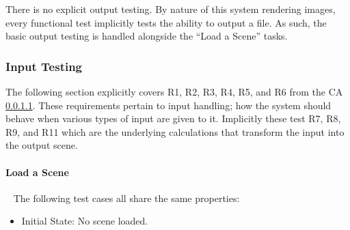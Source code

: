 \documentclass[12pt, titlepage]{article}
\begin{document}
There is no explicit output testing. By nature of this system rendering images, 
every functional test implicitly tests the ability to output a file. As such, 
the basic output testing is handled alongside the ``Load a Scene'' tasks.

%

\subsubsection{Input Testing}
The following section explicitly covers R1, R2, R3, R4, R5, and R6  from the CA 
\ref{}.   These requirements pertain to input handling; how the system should 
behave when various types of input are given to it. Implicitly these test R7, 
R8, R9, and R11 which are the underlying calculations that transform the input 
into the output scene.

		
\paragraph{Load a Scene}
~\newline
The following test cases all share the same properties:

\begin{itemize}
	\item[] Initial State: No scene loaded.
\end{itemize}
\end{document}
